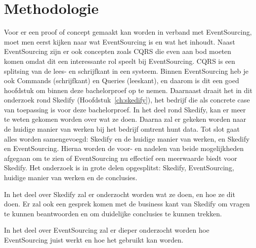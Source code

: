 
\chapter{Methodologie}
\label{ch:methodologie}



Voor er een proof of concept gemaakt kan worden in verband met EventSourcing, moet men eerst kijken naar wat EventSourcing is en wat het inhoudt. Naast EventSourcing zijn er ook concepten zoals \gls{CQRS} die even aan bod moeten komen omdat dit een interessante rol speelt bij EventSourcing. \gls{CQRS} is een splitsing van de lees- en schrijfkant in een systeem. Binnen EventSourcing heb je ook Commands (schrijfkant) en Queries (leeskant), en daarom is dit een goed hoofdstuk om binnen deze bachelorproef op te nemen. Daarnaast draait het in dit onderzoek rond Skedify (Hoofdstuk~\ref{ch:skedify}), het bedrijf die als concrete case van toepassing is voor deze bachelorproef. In het deel rond Skedify, kan er meer te weten gekomen worden over wat ze doen. Daarna zal er gekeken worden naar de huidige manier van werken bij het bedrijf omtrent hunt data. Tot slot gaat alles worden samengevoegd: Skedify en de huidige manier van werken, en Skedify en EventSourcing. Hierna worden de voor- en nadelen van beide mogelijkheden afgegaan om te zien of EventSourcing nu effectief een meerwaarde biedt voor Skedify. Het onderzoek is in grote delen opgesplitst: Skedify, EventSourcing, huidige manier van werken en de conclusies.

In het deel over Skedify zal er onderzocht worden wat ze doen, en hoe ze dit doen. Er zal ook een gesprek komen met de business kant van Skedify om vragen te kunnen beantwoorden en om duidelijke conclusies te kunnen trekken.

In het deel over EventSourcing zal er dieper onderzocht worden hoe EventSourcing juist werkt en hoe het gebruikt kan worden.